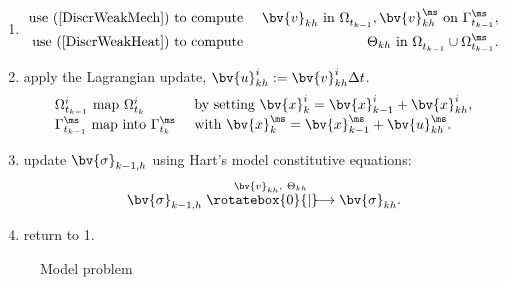 \begin{minipage}[b]{17cm}
\begin{enumerate}
\item 
\begin{minipage}[l]{10cm}
\begin{eqnarray}\nonumber
\mbox{use }(\ref{DiscrWeakMech})  & \mbox{ to compute }& \bv{v}^{\sl}_{kh} \mbox{ in }\Omega^{\sl}_{t_{k-1}},  \bv{v}^{\ms}_{kh} \mbox{ on }\Gamma^{\ms}_{t_{k-1}},
\\
\mbox{use }(\ref{DiscrWeakHeat})  &\mbox{ to compute }&\Theta_{kh}\mbox{ in } \Omega^{\sl}_{t_{k-1}}\cup\Omega^{\ms}_{t_{k-1}}.\nonumber
\end{eqnarray}
\end{minipage}
\item apply the Lagrangian update, $\bv{u}^i_{kh}:=\bv{v}^{i}_{kh}\Delta t$.
\begin{equation}\nonumber
\begin{array}{ll}
\Omega^i_{t_{k-1}}\mbox{ map }  \Omega^i_{t_{k}} &\mbox{ by setting }  \bv{x}_k^i=\bv{x}^i_{k-1}+\bv{x}^i_{kh}, \\
\Gamma^{\ms}_{t_{k-1}}\mbox{ map into }  \Gamma^{\ms}_{t_{k}} &\mbox{  with } \bv{x}_k^{\ms}=\bv{x}^{\ms}_{k-1}+\bv{u}^{\ms}_{kh}. \\
\end{array}
\end{equation}
\item {} update  $\bv{\sigma}_{k-1,h}$ using Hart's model constitutive equations: \\  \begin{equation}\nonumber
\bv{\sigma}^{\sl}_{k-1,h}\stackrel{\bv{v}^{\sl}_{kh},~\Theta_{kh}}{\rotatebox{0}{|}\!\!\!\!\longrightarrow}\bv{\sigma}^{\sl}_{kh}.
\end{equation}

\item return to 1.
\end{enumerate}
\end{minipage}

\begin{figure}
\begin{center}
\begin{minipage}[c]{8.5cm}
\caption{Model problem}\label{fig:MetalChipingModelProblem}
\end{minipage}
\end{center}
\end{figure}

